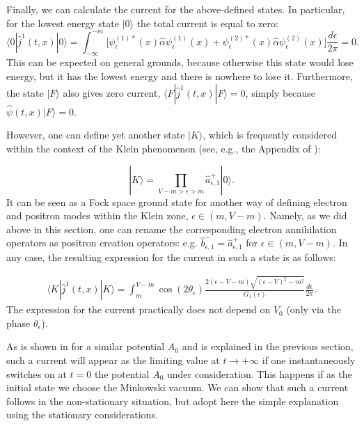 \documentclass[12pt]{article}
\begin{document}
Finally, we can calculate the current for the above-defined states. In particular, for the lowest energy state $|0\rangle$ the total current is equal to zero: 
\begin{equation}
    \langle0|\hat{j}^{1}(t,x)|0\rangle=\int^{-m}_{-\infty} \Big[\psi^{(1)*}_{\epsilon}(x)\hat{\alpha}\psi^{(1)}_{\epsilon}(x) + \psi^{(2)*}_{\epsilon}(x)\hat{\alpha}\psi^{(2)}_{\epsilon}(x) \Big]\frac{d\epsilon}{2\pi}=0.
\end{equation}
This can be expected on general grounds, because otherwise this state would lose energy, but it has the lowest energy and there is nowhere to lose it. Furthermore, the state $|F\rangle$ also gives zero current, $\langle F|\hat{j}^{1}(t,x)|F\rangle = 0$, simply because $\hat{\psi}(t,x)|F\rangle=0.$

However, one can define yet another state $|K\rangle$\cite{Akhmedov:2025jtk}, which is frequently considered within the context of the Klein phenomenon (see, e.g., the Appendix of \cite{Akhmedov:2020dgc}):

\[|K\rangle=\prod_{V-m>\epsilon>m}\hat{a}^{+}_{\epsilon,1}|0\rangle.\]
It can be seen as a Fock space ground state for another way of defining electron and positron modes within the Klein zone, $\epsilon \in (m,V-m)$. Namely, as we did above in this section, one can rename the corresponding electron annihilation operators as positron creation operators: e.g. $\hat{b}^{-}_{\epsilon,1}=\hat{a}^{+}_{\epsilon,1}$ for $\epsilon \in(m,V-m)$. In any case, the resulting expression for the current in such a state is as follows:

\begin{eqnarray}\label{theresult}
\langle K|\hat{j}^1(t,x)|K\rangle=\int_m^{V-m} \cos(2\theta_{\epsilon})\frac{2(\epsilon-V-m)\sqrt{(\epsilon-V)^2-m^2}}{G_1(\epsilon)}\frac{d\epsilon}{2\pi}.
\end{eqnarray}
The expression for the current practically does not depend on $V_0$ (only via the phase $\theta_\epsilon$). 

As is shown in \cite{Akhmedov:2025jtk} for a similar potential $A_0$ and is explained in the previous section, such a current will appear as the limiting value at $t\to +\infty$ if one instantaneously switches on at $t=0$ the potential $A_0$ under consideration. This happens if as the initial state we choose the Minkowski vacuum. We can show that such a current follows in the non-stationary situation, but adopt here the simple explanation using the stationary considerations.
\end{document}
